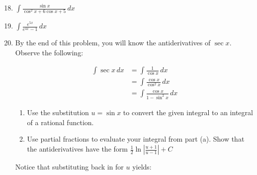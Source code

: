 \documentclass[12pt]{article}
\newif\ifans
\begin{document}
\begin{enumerate}
\setcounter{enumi}{17}

\item $\int \frac{\sin{x}}{\cos^2{x}+6\cos{x}+5} \,dx$

\ifans{\fbox{$\frac{1}{4}\ln{|\cos{x}+5|}-\frac{1}{4}\ln{|\cos{x}+1|}+C$}} \fi

\item $\int \frac{e^{5x}}{e^{4x}-1} \,dx$

\ifans{\fbox{$e^{x}+\frac{1}{4}\ln|e^x-1|-\frac{1}{4}\ln(e^x+1)-\frac{1}{2}\tan^{-1}(e^x)+C$}} \fi

\newpage

\item By the end of this problem, you will know the antiderivatives of $\sec{x}$.  Observe the following:
\begin{center}
\begin{align*}
\int \sec{x} \,dx &= \int \frac{1}{\cos{x}} \,dx\\
&= \int \frac{\cos{x}}{\cos^2{x}} \,dx\\
&= \int \frac{\cos{x}}{1-\sin^2{x}} \,dx
\end{align*}
\end{center}
\begin{enumerate}

\item Use the substitution $u=\sin{x}$ to convert the given integral to an integral of a rational function.  

\ifans{\fbox{$\int \frac{1}{1-u^2} \,du$}} \fi

\item Use partial fractions to evaluate your integral from part (a).  Show that the antiderivatives have the form $\frac{1}{2}\ln{\left|\frac{u+1}{u-1}\right|}+C$

\ifans{\fbox{\parbox{1\linewidth}{
\begin{align*}
\int \frac{1}{1-u^2}\,du &= \int \frac{1}{2}\left(\frac{1}{u+1}\right)-\frac{1}{2}\left(\frac{1}{u-1}\right) \,du\\
&=\frac{1}{2}\ln{|u+1|}-\frac{1}{2}\ln{|u-1|}+C\\
&=\frac{1}{2}\ln{\left|\frac{u+1}{u-1}\right|}+C
\end{align*}
}}} \fi

\end{enumerate}

Notice that substituting back in for $u$ yields:


\end{enumerate}
\end{document}

